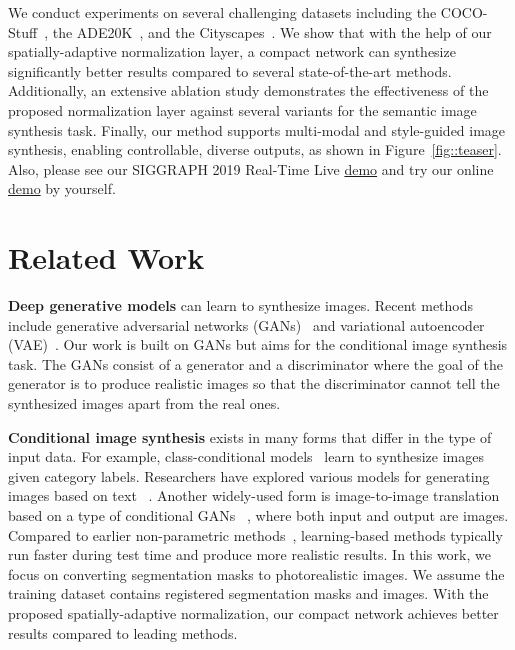 We conduct experiments on several challenging datasets including the  COCO-Stuff~\cite{caesar2018coco,lin2014microsoft}, the ADE20K~\cite{zhou2017scene}, and the Cityscapes~\cite{cordts2016cityscapes}. We show that with the help of our spatially-adaptive normalization layer, a compact network can synthesize significantly better results compared to several state-of-the-art methods. Additionally, an extensive ablation study demonstrates the effectiveness of the proposed normalization layer against several variants for the semantic image synthesis task. Finally, our method supports multi-modal and style-guided image synthesis, enabling controllable, diverse outputs, as shown in Figure~\ref{fig::teaser}.  Also, please see our SIGGRAPH 2019 Real-Time Live \href{https://www.youtube.com/watch?v=Gz9weuemhDA&feature=youtu.be&t=2949}{demo}  and try our online  \href{https://github.com/NVlabs/SPADE}{demo} by yourself.

\section{Related Work}

{\bf Deep generative models} can learn to synthesize images. Recent methods include generative adversarial networks (GANs)~\cite{goodfellow2014generative} and variational autoencoder (VAE)~\cite{kingma2013auto}. Our work is built on GANs but aims for the conditional image synthesis task. The GANs consist of a generator and a discriminator where the goal of the generator is to produce realistic images so that the discriminator cannot tell the synthesized images apart from the real ones.

{\bf Conditional image synthesis} exists in many forms that differ in the type of input data. For example, class-conditional  models~\cite{odena2016conditional,miyato2018cgans,mescheder2018training,brock2018large,mirza2014conditional} learn to synthesize images given category labels. Researchers have explored various models for generating images based on text ~\cite{reed2016generative,zhang2017stackgan,xu2017attngan,hong2018inferring}. Another widely-used form is image-to-image translation based on a type of conditional GANs ~\cite{karacan2016learning,isola2017image,zhu2017unpaired,liu2017unsupervised,zhu2017toward,huang2018multimodal,Zhao2018layout,karacan2018manipulating}, where both input and output are images. Compared to earlier non-parametric methods~\cite{hertzmann2001image,johnson2006semantic,chen2009sketch2photo},  learning-based methods typically run faster during test time and produce more realistic results. In this work, we focus on converting segmentation masks to photorealistic images. We assume the training dataset contains registered segmentation masks and images. With the proposed spatially-adaptive normalization, our compact network achieves better results compared to leading methods.

